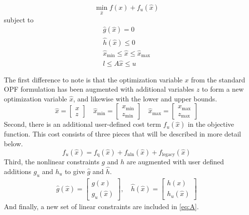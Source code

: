 \documentclass[12pt]{article}
\numberwithin{equation}{section}
\numberwithin{table}{section}
\numberwithin{figure}{section}
\begin{document}
\begin{equation}
\min_{\hat{x}} f(x) + f_u(\hat{x})
\label{eq:minfxhat}
\end{equation}
subject to
\begin{eqnarray}
& \hat{g}(\hat{x}) = 0 & \\
& \hat{h}(\hat{x}) \le 0 & \\
& \hat{x}_\mathrm{min} \le \hat{x} \le \hat{x}_\mathrm{max} & \\
& l \le A \hat{x} \le u & \label{eq:A}
\end{eqnarray}

The first difference to note is that the optimization variable $x$ from the standard OPF formulation has been augmented with additional variables $z$ to form a new optimization variable $\hat{x}$, and likewise with the lower and upper bounds.
\begin{equation}
\hat{x} = \left[\begin{array}{c}x \\ z \end{array}\right] \quad
\hat{x}_\mathrm{min} = \left[\begin{array}{c}x_\mathrm{min} \\ z_\mathrm{min} \end{array}\right] \quad
\hat{x}_\mathrm{max} = \left[\begin{array}{c}x_\mathrm{max} \\ z_\mathrm{max} \end{array}\right]
\label{eq:xhat}
\end{equation}
Second, there is an additional user-defined cost term $f_u(\hat{x})$ in the objective function. This cost consists of three pieces that will be described in more detail below.
\begin{equation}
f_u(\hat{x}) = f_\mathrm{q}(\hat{x}) + f_\mathrm{nln}(\hat{x}) + f_\mathrm{legacy}(\hat{x})
\label{eq:f_u}
\end{equation}
Third, the nonlinear constraints $g$ and $h$ are augmented with user defined additions $g_u$ and $h_u$ to give $\hat{g}$ and $\hat{h}$.
\begin{eqnarray}
& \hat{g}(\hat{x}) = \left[\begin{array}{c}g(x) \\ g_u(\hat{x}) \end{array}\right], \quad \hat{h}(\hat{x}) = \left[\begin{array}{c}h(x) \\ h_u(\hat{x}) \end{array}\right] &
\end{eqnarray}
And finally, a new set of linear constraints are included in \eqref{eq:A}.
\end{document}
